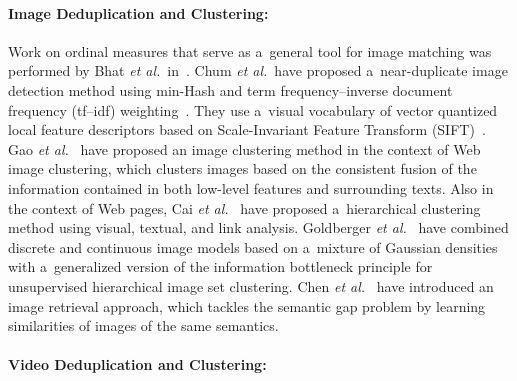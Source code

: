 \paragraph{Image Deduplication and Clustering:}

Work on ordinal measures that serve as a~general tool for
image matching was performed by Bhat \emph{et al.}\
in~\cite{bhat1998imagecorrespondence}.
Chum \emph{et al.}\ have proposed a~near-duplicate image detection method
using min-Hash and term frequency--inverse document frequency (tf--idf)
weighting~\cite{chum2008nearduplicate}.
They use a~visual vocabulary of vector quantized local feature descriptors based on
Scale-Invariant Feature Transform (SIFT)~\cite{lowe1999sift}.
Gao \emph{et al.}~\cite{gao2005webimageclustering} have proposed an image clustering method
in the context of Web image clustering, which clusters images
based on the consistent fusion of the information contained in
both low-level features and surrounding texts.
Also in the context of Web pages, Cai
\emph{et al.}~\cite{cai2004hierarchicalclustering} have proposed
a~hierarchical clustering method using visual, textual, and link analysis.
Goldberger \emph{et al.}~\cite{goldberger2006unsupervisedclustering} 
have combined discrete and continuous image models based on a~mixture of Gaussian densities
with a~generalized version of the information bottleneck principle
for unsupervised hierarchical image set clustering. 
Chen \emph{et al.}~\cite{chen2003cbir} have introduced an image retrieval approach,
which tackles the semantic gap problem by learning similarities
of images of the same semantics.

\paragraph{Video Deduplication and Clustering:}

